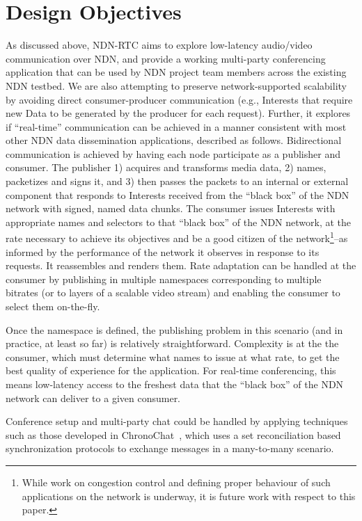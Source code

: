 \documentclass{icn/sig-alternate-2013} %
\newcommand{\ndnrtcName}{NDN-RTC} %
\begin{document}
\section{Design Objectives}
\label{sec:goals}
As discussed above, \ndnrtcName{} aims to explore low-latency audio/video communication over NDN, and provide a working multi-party conferencing application that can be used by NDN project team members across the existing NDN testbed.  We are also attempting to preserve network-supported scalability by avoiding direct consumer-producer communication (e.g., Interests that require new Data to be generated by the producer for each request).   Further, it explores if ``real-time'' communication can be achieved in a manner consistent with most other NDN data dissemination applications, described as follows. Bidirectional communication is achieved by having each node participate as a publisher and consumer. The publisher 1) acquires and transforms media data, 2) names, packetizes and signs it, and 3) then passes the packets to an internal or external component that responds to Interests received from the ``black box'' of the NDN network with signed, named data chunks. The consumer issues Interests with appropriate names and selectors to that ``black box'' of the NDN network, at the rate necessary to achieve its objectives and be a good citizen of the network\footnote{While work on congestion control and defining proper behaviour of such applications on the network is underway, it is future work with respect to this paper.}--as informed by the performance of the network it observes in response to its requests. It reassembles and renders them.  Rate adaptation can be handled at the consumer by publishing in multiple namespaces corresponding to multiple bitrates (or to layers of a scalable video stream) and enabling the consumer to select them on-the-fly.

Once the namespace is defined, the publishing problem in this scenario (and in practice, at least so far) is relatively straightforward.  Complexity is at the the consumer, which must determine what names to issue at what rate, to get the best quality of experience for the application.  For real-time conferencing, this means low-latency access to the freshest data that the ``black box'' of the NDN network can deliver to a given consumer.  

Conference setup and multi-party chat could be handled by applying techniques such as those developed in ChronoChat~\cite{chronochat}, which uses a set reconciliation based synchronization protocols to exchange messages in a many-to-many scenario. 
\end{document}
